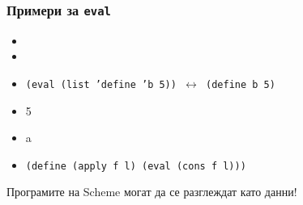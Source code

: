 \documentclass{beamer}
\begin{document}
\begin{frame}
  \frametitle{Примери за \tt{eval}}

  \begin{itemize}[<+->]
  \item {}
  \item {}
  \item \tt{(eval (list 'define 'b 5))} $\longleftrightarrow$ \tt{(define b 5)}
  \item {}5
  \item {\small {}a}
  \item \tt{(define (apply f l) (eval (cons f l)))}
  \end{itemize}

  \onslide<+->
  \alert{Програмите на Scheme могат да се разглеждат като данни!}
\end{frame}
\end{document}

